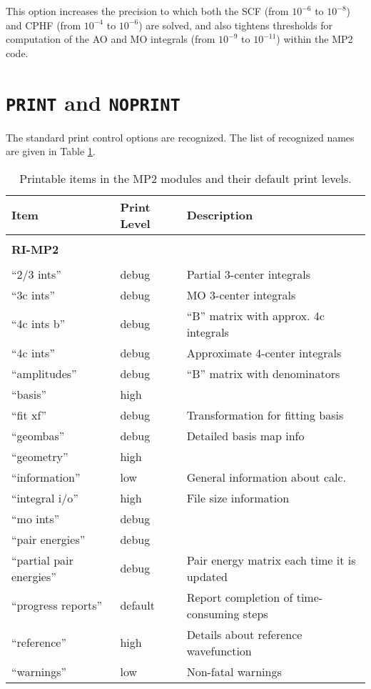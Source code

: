  This option increases the precision to which both the SCF (from
$10^{-6}$ to $10^{-8}$) and CPHF (from $10^{-4}$ to $10^{-6}$) are
solved, and also tightens thresholds for computation of the AO and MO
integrals (from $10^{-9}$ to $10^{-11}$) within the MP2 code.

\section{{\tt PRINT} and {\tt NOPRINT}}

The standard print control options are recognized.  The list of
recognized names are given in Table \ref{tbl:mp2-printable}.

\begin{table}
\caption{Printable items in the MP2 modules and their default print levels.}
\label{tbl:mp2-printable}
\begin{tabular}{lll}
\hline\hline
Item                    & Print Level   & Description \\
\hline

        & & \\ 
{\bf RI-MP2}  & & \\ \hline
        & & \\ 
``2/3 ints''              & debug         & Partial 3-center integrals \\
``3c ints''               & debug         & MO 3-center integrals  \\
``4c ints b''             & debug         & ``B'' matrix with approx. 4c integrals \\
``4c ints''               & debug         & Approximate 4-center integrals \\
``amplitudes''            & debug         & ``B'' matrix with denominators \\
``basis''                 & high          & \\
``fit xf''                & debug         & Transformation for fitting basis \\
``geombas''               & debug         & Detailed basis map info\\
``geometry''              & high          & \\
``information''           & low           & General information about calc.\\
``integral i/o''          & high          & File size information\\
``mo ints''               & debug         & \\
``pair energies''         & debug         & \\
``partial pair energies'' & debug         & Pair energy matrix each time it is updated \\
``progress reports''      & default       & Report completion of time-consuming steps\\
``reference''             & high          & Details about reference wavefunction\\
``warnings''              & low           & Non-fatal warnings \\
\hline\hline
\end{tabular}
\end{table}

